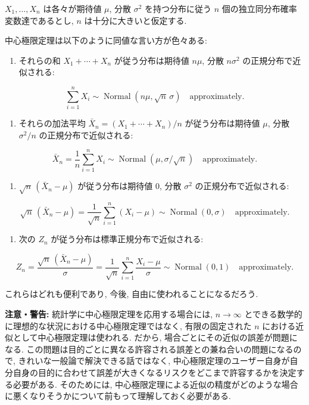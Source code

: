 \documentclass[10pt, a4paper,xelatex,ja=standard]{bxjsarticle}
\providecommand{\tightlist}{%
      \setlength{\itemsep}{0pt}\setlength{\parskip}{0pt}}
\newcommand\op{\operatorname}
\begin{document}
\(X_1,\ldots,X_n\) は各々が期待値 \(\mu\), 分散 \(\sigma^2\)
を持つ分布に従う \(n\) 個の独立同分布確率変数達であるとし, \(n\)
は十分に大きいと仮定する.

中心極限定理は以下のように同値な言い方が色々ある:

\begin{enumerate}
\def\labelenumi{(\arabic{enumi})}
\tightlist
\item
  それらの和 \(X_1+\cdots+X_n\) が従う分布は期待値 \(n\mu\), 分散
  \(n\sigma^2\) の正規分布で近似される:
\end{enumerate}

\[
\sum_{i=1}^n X_i
\sim \op{Normal}\left(n\mu, \sqrt{n}\,\sigma\right)\quad\text{approximately}.
\]

\begin{enumerate}
\def\labelenumi{(\arabic{enumi})}
\setcounter{enumi}{1}
\tightlist
\item
  それらの加法平均 \(\bar{X}_n = (X_1+\cdots+X_n)/n\) が従う分布は期待値
  \(\mu\), 分散 \(\sigma^2/n\) の正規分布で近似される:
\end{enumerate}

\[
\bar{X}_n = \frac{1}{n}\sum_{i=1}^n X_i
\sim \op{Normal}\left(\mu, \sigma/\sqrt{n}\right)\quad\text{approximately}.
\]

\begin{enumerate}
\def\labelenumi{(\arabic{enumi})}
\setcounter{enumi}{2}
\tightlist
\item
  \(\sqrt{n}\,(\bar{X}_n - \mu)\) が従う分布は期待値 \(0\), 分散
  \(\sigma^2\) の正規分布で近似される:
\end{enumerate}

\[
\sqrt{n}\,(\bar{X}_n - \mu) =
\frac{1}{\sqrt{n}}\sum_{i=1}^n (X_i - \mu)
\sim \op{Normal}(0, \sigma)\quad\text{approximately}.
\]

\begin{enumerate}
\def\labelenumi{(\arabic{enumi})}
\setcounter{enumi}{3}
\tightlist
\item
  次の \(Z_n\) が従う分布は標準正規分布で近似される:
\end{enumerate}

\[
Z_n = \frac{\sqrt{n}\,(\bar{X}_n - \mu)}{\sigma} =
\frac{1}{\sqrt{n}}\sum_{i=1}^n \frac{X_i - \mu}{\sigma}
\sim \op{Normal}(0, 1)\quad\text{approximately}.
\]

これらはどれも便利であり, 今後, 自由に使われることになるだろう.

\textbf{注意・警告:} 統計学に中心極限定理を応用する場合には,
\(n\to\infty\) とできる数学的に理想的な状況における中心極限定理ではなく,
有限の固定された \(n\) における近似として中心極限定理は使われる. だから,
場合ごとにその近似の誤差が問題になる.
この問題は目的ごとに異なる許容される誤差との兼ね合いの問題になるので,
きれいな一般論で解決できる話ではなく,
中心極限定理のユーザー自身が自分自身の目的に合わせて誤差が大きくなるリスクをどこまで許容するかを決定する必要がある.
そのためには,
中心極限定理による近似の精度がどのような場合に悪くなりそうかについて前もって理解しておく必要がある.
\end{document}
